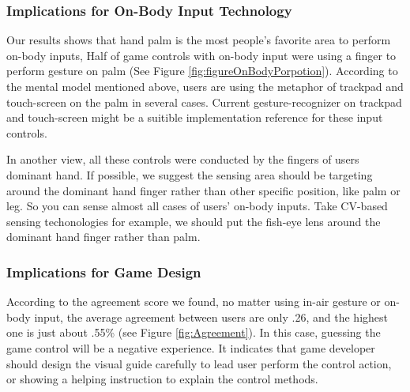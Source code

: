 \documentclass{sigchi}
\begin{document}
  \subsubsection{Implications for On-Body Input Technology}
    Our results shows that hand palm is the most people's favorite area to perform on-body inputs,
    Half of game controls with on-body input were using a finger to perform gesture on palm (See Figure \ref{fig:figureOnBodyPorpotion}). According to the mental model mentioned above, users are using the metaphor of trackpad and touch-screen on the palm in several cases. Current gesture-recognizer on trackpad and touch-screen might be a suitible implementation reference for these input controls.

    In another view, all these controls were conducted by the fingers of users dominant hand. If possible, we suggest the sensing area should be targeting around the dominant hand finger rather than other specific position, like palm or leg. So you can sense almost all cases of users' on-body inputs. Take CV-based sensing techonologies for example, we should put the fish-eye lens around the dominant hand finger rather than palm.



  \subsubsection{Implications for Game Design}
  According to the agreement score we found, no matter using in-air gesture or on-body input, the average agreement between users are only .26, and the highest one is just about .55\% (see Figure \ref{fig:Agreement}). In this case, guessing the game control will be a negative experience. It indicates that game developer should design the visual guide carefully to lead user perform the control action, or showing a helping instruction to explain the control methods.
\end{document}
